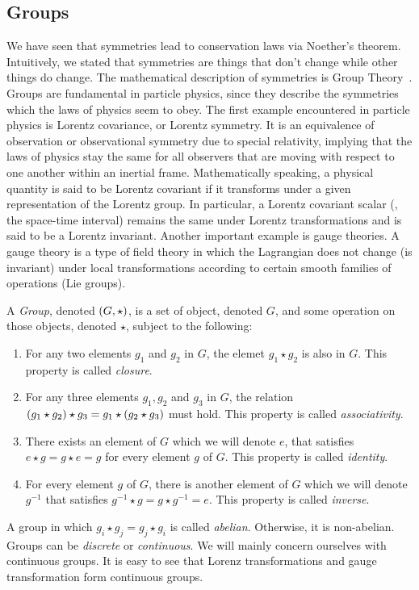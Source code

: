 \clearpage
\subsection{Groups}

We have seen that symmetries lead to conservation laws via Noether's theorem. Intuitively, we stated that symmetries are things that don't change while other things do change. The mathematical description of symmetries is Group Theory~\cite{Robinson2011-dv}. Groups are fundamental in particle physics, since they describe the symmetries which the laws of physics seem to obey. The first example encountered in particle physics is Lorentz covariance, or Lorentz symmetry. It is an equivalence of observation or observational symmetry due to special relativity, implying that the laws of physics stay the same for all observers that are moving with respect to one another within an inertial frame. Mathematically speaking, a physical quantity is said to be Lorentz covariant if it transforms under a given representation of the Lorentz group. In particular, a Lorentz covariant scalar (\ie, the space-time interval) remains the same under Lorentz transformations and is said to be a Lorentz invariant. Another important example is gauge theories. A gauge theory is a type of field theory in which the Lagrangian does not change (is invariant) under local transformations according to certain smooth families of operations (Lie groups).

A \emph{Group}, denoted $\qty(G, \star)$, is a set of object, denoted $G$, and some operation on those objects, denoted $\star$, subject to the following:
\begin{enumerate}
\item For any two elements $g_1$ and $g_2$ in $G$, the elemet $g_1\star g_2$ is also in $G$. This property is called \emph{closure}.
\item For any three elements $g_1, g_2$ and $g_3$ in $G$, the relation $\qty(g_1\star g_2)\star g_3=g_1\star\qty(g_2\star g_3)$ must hold. This property is called \emph{associativity}.
\item There exists an element of $G$ which we will denote $e$, that satisfies $e\star g = g\star e = g$ for every element $g$ of $G$. This property is called \emph{identity}.
\item For every element $g$ of $G$, there is another element of $G$ which we will denote $g^{-1}$ that satisfies $g^{-1}\star g = g\star g^{-1}=e$. This property is called \emph{inverse}.
\end{enumerate}
A group in which $g_i\star g_j=g_j\star g_i$ is called \emph{abelian}. Otherwise, it is non-abelian. Groups can be \emph{discrete} or \emph{continuous}. We will mainly concern ourselves with continuous groups. It is easy to see that Lorenz transformations and gauge transformation form continuous groups.

